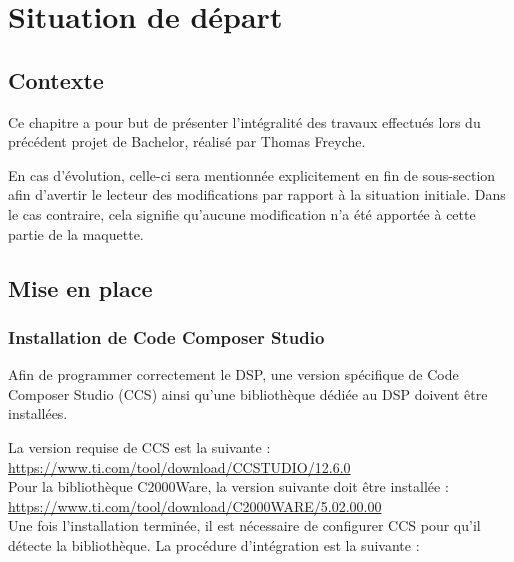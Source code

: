 \chapter{Situation de départ}

\section{Contexte}
Ce chapitre a pour but de présenter l'intégralité des travaux effectués lors du précédent projet de Bachelor, réalisé par Thomas Freyche.

En cas d'évolution, celle-ci sera mentionnée explicitement en fin de sous-section afin d'avertir le lecteur des modifications par rapport à la situation initiale. Dans le cas contraire, cela signifie qu'aucune modification n'a été apportée à cette partie de la maquette.

\section{Mise en place}

\subsection{Installation de Code Composer Studio}
\label{subsec:CCS_install}
Afin de programmer correctement le DSP, une version spécifique de Code Composer Studio (CCS) ainsi qu'une bibliothèque dédiée au DSP doivent être installées.

La version requise de CCS est la suivante \cite{CCS_Install} :
\url{https://www.ti.com/tool/download/CCSTUDIO/12.6.0} \\

Pour la bibliothèque C2000Ware, la version suivante doit être installée \cite{C2000_Install} :
\url{https://www.ti.com/tool/download/C2000WARE/5.02.00.00}\\

Une fois l'installation terminée, il est nécessaire de configurer CCS pour qu'il détecte la bibliothèque. La procédure d'intégration est la suivante :

